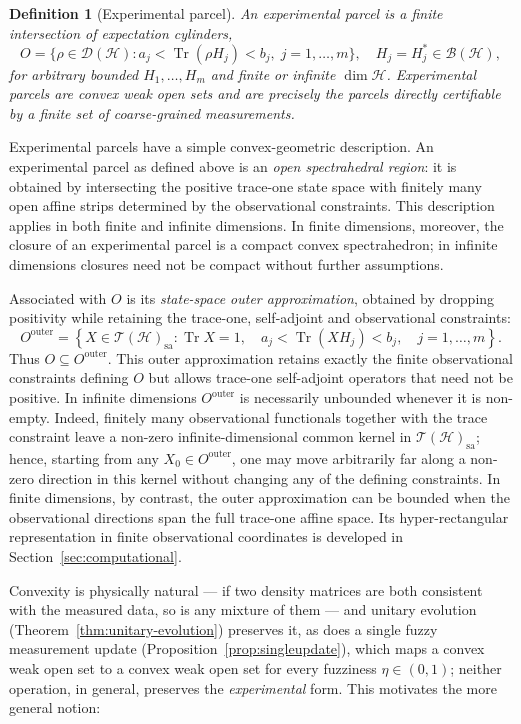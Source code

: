 \documentclass[11pt, onecolumn]{article}
\newtheorem{definition}{Definition}
\begin{document}
\begin{definition}[Experimental parcel]
\label{def:experimental-parcel}
An \emph{experimental parcel} is a finite intersection of expectation cylinders,
\[
O = \{\rho \in \mathcal{D}(\mathcal{H}) : a_j < \operatorname{Tr}(\rho H_j) < b_j,\; j=1,\dots,m\},
\quad H_j = H_j^*\in\mathcal B(\mathcal H),
\]
for arbitrary bounded $H_1,\dots,H_m$ and finite or infinite $\dim\mathcal H$. Experimental parcels are convex weak open sets and are precisely the parcels directly certifiable by a finite set of coarse-grained measurements.
\end{definition}
Experimental parcels have a simple convex-geometric description. An
experimental parcel as defined above is an \emph{open spectrahedral
region}: it is obtained by intersecting the positive trace-one state
space with finitely many open affine strips determined by the
observational constraints. This description applies in both finite and
infinite dimensions. In finite dimensions, moreover, the closure of an
experimental parcel is a compact convex spectrahedron; in infinite
dimensions closures need not be compact without further assumptions.

Associated with $O$ is its \emph{state-space outer approximation},
obtained by dropping positivity while retaining the trace-one,
self-adjoint and observational constraints:
\[
O^{\mathrm{outer}}
=
\left\{
X\in\mathcal T(\mathcal H)_{\mathrm{sa}}:
\operatorname{Tr}X=1,\quad
a_j<\operatorname{Tr}(XH_j)<b_j,\quad j=1,\ldots,m
\right\}.
\]
Thus $O\subseteq O^{\mathrm{outer}}$.  This outer approximation retains
exactly the finite observational constraints defining $O$ but allows
trace-one self-adjoint operators that need not be positive. In infinite dimensions $O^{\mathrm{outer}}$ is necessarily unbounded
whenever it is non-empty. Indeed, finitely many observational
functionals together with the trace constraint leave a non-zero
infinite-dimensional common kernel in
$\mathcal T(\mathcal H)_{\mathrm{sa}}$; hence, starting from any
$X_0\in O^{\mathrm{outer}}$, one may move arbitrarily far along a
non-zero direction in this kernel without changing any of the defining
constraints. In finite dimensions, by contrast, the outer approximation
can be bounded when the observational directions span the full trace-one
affine space. Its
hyper-rectangular representation in finite observational coordinates is
developed in Section~\ref{sec:computational}.

Convexity is physically natural — if two density matrices are both consistent with the measured data, so is any mixture of them — and unitary evolution (Theorem~\ref{thm:unitary-evolution}) preserves it, as does a single fuzzy measurement update (Proposition~\ref{prop:singleupdate}), which maps a convex weak open set to a convex weak open set for every fuzziness $\eta\in(0,1)$; neither operation, in general, preserves the \emph{experimental} form. This motivates the more general notion:
\end{document}
